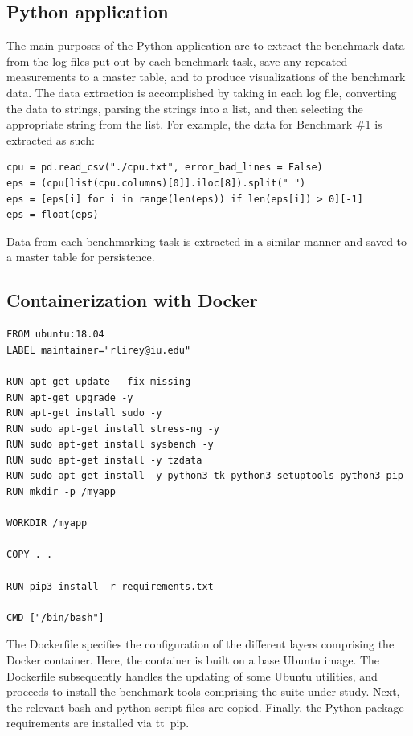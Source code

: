 \documentclass[sigconf]{acmart}
\begin{document}
\subsection{Python application}

The main purposes of the Python application are to extract the benchmark data from the log files put out by each benchmark task, save any repeated measurements to a master table, and to produce visualizations of the benchmark data. The data extraction is accomplished by taking in each log file, converting the data to strings, parsing the strings into a list, and then selecting the appropriate string from the list. For example, the data for Benchmark \#1 is extracted as such:

\begin{lstlisting}
cpu = pd.read_csv("./cpu.txt", error_bad_lines = False)
eps = (cpu[list(cpu.columns)[0]].iloc[8]).split(" ")
eps = [eps[i] for i in range(len(eps)) if len(eps[i]) > 0][-1]
eps = float(eps)
\end{lstlisting}

Data from each benchmarking task is extracted in a similar manner and saved to a master table for persistence.

\subsection{Containerization with Docker}

\begin{lstlisting}
FROM ubuntu:18.04
LABEL maintainer="rlirey@iu.edu"

RUN apt-get update --fix-missing
RUN apt-get upgrade -y
RUN apt-get install sudo -y
RUN sudo apt-get install stress-ng -y
RUN sudo apt-get install sysbench -y
RUN sudo apt-get install -y tzdata
RUN sudo apt-get install -y python3-tk python3-setuptools python3-pip
RUN mkdir -p /myapp

WORKDIR /myapp

COPY . .

RUN pip3 install -r requirements.txt

CMD ["/bin/bash"]
\end{lstlisting}

The Dockerfile specifies the configuration of the different layers comprising the Docker container. Here, the container is built on a base Ubuntu image. The Dockerfile subsequently handles the updating of some Ubuntu utilities, and proceeds to install the benchmark tools comprising the suite under study. Next, the relevant bash and python script files are copied. Finally, the Python package requirements are installed via {tt\ pip}.
\end{document}
